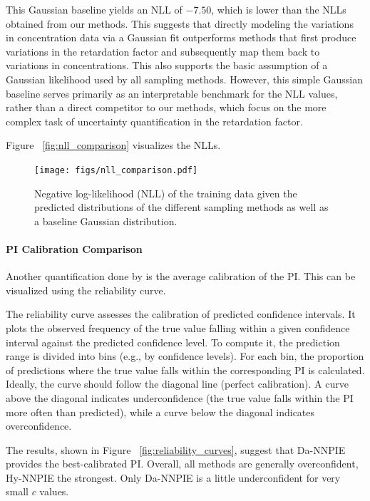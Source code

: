 This Gaussian baseline yields an NLL of $-7.50$, which is lower than the NLLs obtained from our methods. This suggests that directly modeling the variations in concentration data via a Gaussian fit outperforms methods that first produce variations in the retardation factor and subsequently map them back to variations in concentrations. This also supports the basic assumption of a Gaussian likelihood used by all sampling methods. However, this simple Gaussian baseline serves primarily as an interpretable benchmark for the NLL values, rather than a direct competitor to our methods, which focus on the more complex task of uncertainty quantification in the retardation factor.


Figure ~\vref{fig:nll_comparison} visualizes the NLLs.

\begin{figure}[h]
    \centering
    \texttt{[image: figs/nll\_comparison.pdf]}
    \caption{Negative log-likelihood (NLL) of the training data given the predicted distributions of the different sampling methods as well as a baseline Gaussian distribution.}
    \label{fig:nll_comparison}
\end{figure}


\paragraph{PI Calibration Comparison}
Another quantification done by \cite{finn} is the average calibration of the PI. This can be visualized using the reliability curve.

The reliability curve assesses the calibration of predicted confidence intervals. It plots the observed frequency of the true value falling within a given confidence interval against the predicted confidence level. To compute it, the prediction range is divided into bins (e.g., by confidence levels). For each bin, the proportion of predictions where the true value falls within the corresponding PI is calculated. Ideally, the curve should follow the diagonal line (perfect calibration). A curve above the diagonal indicates underconfidence (the true value falls within the PI more often than predicted), while a curve below the diagonal indicates overconfidence.

The results, shown in Figure ~\vref{fig:reliability_curves}, suggest that Da-NNPIE provides the best-calibrated PI. Overall, all methods are generally overconfident, Hy-NNPIE the strongest. Only Da-NNPIE is a little underconfident for very small $c$ values.

